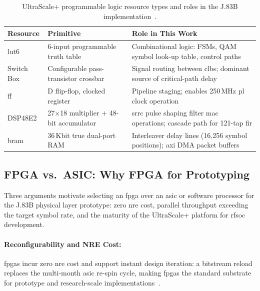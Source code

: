 \begin{table}[htbp]
  \caption{UltraScale+ programmable logic resource types and
           roles in the J.83B
           implementation~\cite{AMD_UG574,AMD_UG579,Boppana2015}.}
  \label{tab:fpga_resources}
  \centering
  \begin{tabular}{p{1.8cm}p{4.0cm}p{8.0cm}}
    \hline
    Resource   & Primitive & Role in This Work \\
    \hline
    \ac{lut6} & 6-input programmable truth table~\cite{AMD_UG574}
               & Combinational logic: FSMs, QAM symbol look-up
                 table, control paths \\[4pt]
    Switch Box & Configurable pass-transistor crossbar~\cite{AMD_UG574}
               & Signal routing between \acp{clb}; dominant
                 source of critical-path delay \\[4pt]
    \ac{ff}   & D flip-flop, clocked register~\cite{AMD_UG574}
               & Pipeline staging; enables 250\,MHz \ac{pl}
                 clock operation \\[4pt]
    DSP48E2    & 27$\times$18 multiplier $+$ 48-bit
                 accumulator~\cite{AMD_UG579}
               & \ac{srrc} pulse shaping filter \ac{mac}
                 operations; cascade path for 121-tap \ac{fir} \\[4pt]
    \ac{bram} & 36\,Kbit true dual-port RAM~\cite{AMD_UG574}
               & Interleaver delay lines (16{,}256 symbol
                 positions); \ac{axi} DMA packet buffers \\
    \hline
  \end{tabular}
\end{table}


\subsection{FPGA vs.\ ASIC: Why FPGA for Prototyping}
\label{subsec:fpga_vs_asic}

Three arguments motivate selecting an \ac{fpga} over an \ac{asic} or
software processor for the J.83B physical layer prototype: zero
\ac{nre} cost, parallel throughput exceeding the target symbol rate,
and the maturity of the UltraScale+ platform for \ac{rfsoc} development.

\paragraph{Reconfigurability and NRE Cost:}
\acp{fpga} incur zero \ac{nre} cost and support instant design
iteration: a bitstream reload replaces the multi-month \ac{asic}
re-spin cycle, making \acp{fpga} the standard substrate for
prototype and research-scale implementations~\cite{Kuon2007}.

